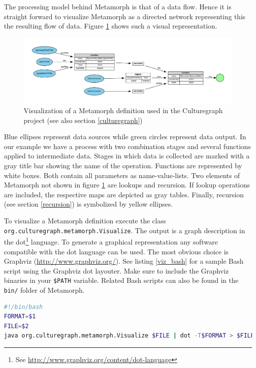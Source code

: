 \documentclass[12pt,a4paper]{article}
\begin{document}
The processing model behind Metamorph is that of a data flow. Hence it is straight forward to visualize Metamorph as a directed network representing this the resulting flow of data. Figure \ref{fig:match-title} shows such a visual representation. 

\begin{figure}[htp]
\centering
\includegraphics[width=1\textwidth]{figures/match-title}
\caption{Visualization of a Metamorph definition used in the Culturegraph project (see also section \ref{culturegraph})}\label{fig:match-title}
\end{figure}

Blue ellipses represent data sources while green circles represent data output. In our example we have a process with two combination stages and several functions applied to intermediate data. Stages in which data is collected are marked with a gray title bar showing the name of the operation. Functions are represented by white boxes. Both contain all parameters as name-value-lists. 
Two elements of Metamorph not shown in figure \ref{fig:match-title} are lookups and recursion. If lookup operations are included, the respective maps are depicted as gray tables. Finally, recursion (see section \ref{recursion}) is symbolized by yellow ellipses.

To visualize a Metamorph definition execute the class {\tt org.\-culturegraph.\-metamorph.\-Visualize}. The output is a graph description in the dot\footnote{See \url{http://www.graphviz.org/content/dot-language}} language. To generate a graphical representation any software compatible with the dot language can be used. The most obvious choice is Graphviz (\url{http://www.graphviz.org/}). See listing \ref{viz_bash} for a sample Bash script using the Graphviz dot layouter. Make sure to include the Graphviz binaries in your {\tt \$PATH} variable. Related Bash scripts can also be found in the {\tt bin/} folder of Metamorph.

\begin{lstlisting}[float=htb, label=viz_bash,caption=Simple Bash script for visualizing a Metamorph definition., language=Bash]
#!/bin/bash
FORMAT=$1
FILE=$2
java org.culturegraph.metamorph.Visualize $FILE | dot -T$FORMAT > $FILE.$FORMAT
\end{lstlisting}
\end{document}
